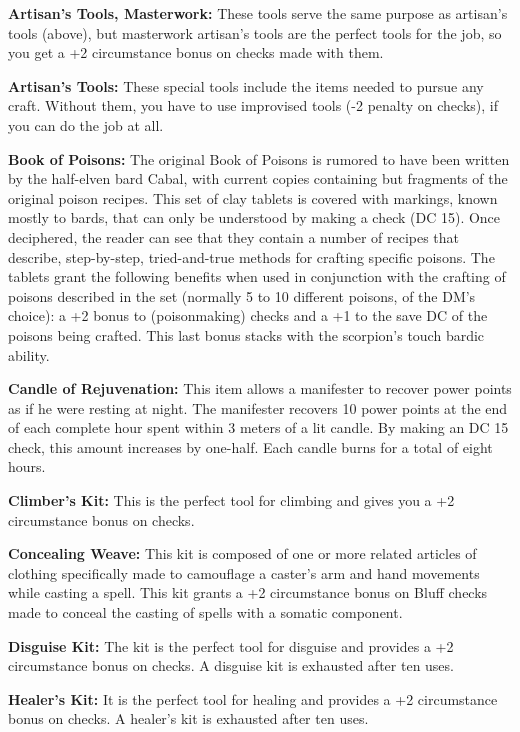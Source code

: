 \textbf{Artisan's Tools, Masterwork:} These tools serve the same purpose as artisan's tools (above), but masterwork artisan's tools are the perfect tools for the job, so you get a +2 circumstance bonus on  checks made with them.

\textbf{Artisan's Tools:} These special tools include the items needed to pursue any craft. Without them, you have to use improvised tools (-2 penalty on  checks), if you can do the job at all.

\textbf{Book of Poisons:} The original Book of Poisons is rumored to have been written by the half-elven bard Cabal, with current copies containing but fragments of the original poison recipes. This set of clay tablets is covered with markings, known mostly to bards, that can only be understood by making a  check (DC 15). Once deciphered, the reader can see that they contain a number of recipes that describe, step-by-step, tried-and-true methods for crafting specific poisons. The tablets grant the following benefits when used in conjunction with the crafting of poisons described in the set (normally 5 to 10 different poisons, of the DM's choice): a +2 bonus to  (poisonmaking) checks and a +1 to the save DC of the poisons being crafted. This last bonus stacks with the scorpion's touch bardic ability.

\textbf{Candle of Rejuvenation:} This item allows a manifester to recover power points as if he were resting at night. The manifester recovers 10 power points at the end of each complete hour spent within 3 meters of a lit candle. By making an  DC 15 check, this amount increases by one-half. Each candle burns for a total of eight hours.

\textbf{Climber's Kit:} This is the perfect tool for climbing and gives you a +2 circumstance bonus on  checks.

\textbf{Concealing Weave:} This kit is composed of one or more related articles of clothing specifically made to camouflage a caster's arm and hand movements while casting a spell. This kit grants a +2 circumstance bonus on Bluff checks made to conceal the casting of spells with a somatic component.

\textbf{Disguise Kit:} The kit is the perfect tool for disguise and provides a +2 circumstance bonus on  checks. A disguise kit is exhausted after ten uses.

\textbf{Healer's Kit:} It is the perfect tool for healing and provides a +2 circumstance bonus on  checks. A healer's kit is exhausted after ten uses.

